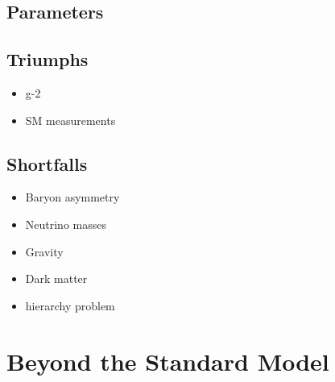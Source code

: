 \subsection{Parameters}


\subsection{Triumphs}

\begin{itemize}
\item g-2
\item SM measurements
\end{itemize}

\subsection{Shortfalls}
\begin{itemize}
\item Baryon asymmetry 
\item Neutrino masses
\item Gravity
\item Dark matter
\item hierarchy problem
\end{itemize}
\section{Beyond the Standard Model}

